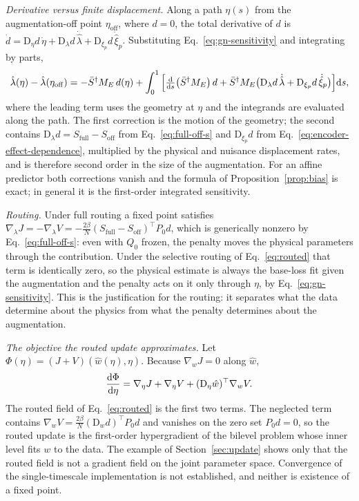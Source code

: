 \documentclass[11pt,a4paper]{article}
\newcommand{\D}{\mathrm D}
\newcommand{\full}{\mathrm{full}}
\newcommand{\off}{\mathrm{off}}
\theoremstyle{remark}
\begin{document}
\emph{Derivative versus finite displacement.} Along a path $\eta(s)$ from the augmentation-off point $\eta_\off$, where $d=0$, the total derivative of $d$ is $\dot d=\D_\eta d\,\dot\eta+\D_\lambda d\,\dot{\hat\lambda}+\D_{\xi_p}d\,\dot{\hat\xi}_p$. Substituting Eq.~\eqref{eq:gn-sensitivity} and integrating by parts,
\begin{equation}\label{eq:path}
 \hat\lambda(\eta)-\hat\lambda(\eta_\off)=-\bar S^\dagger M_E\,d(\eta)
 +\int_0^1\Big[\tfrac{\rm d}{{\rm d}s}\big(\bar S^\dagger M_E\big)\,d
 +\bar S^\dagger M_E\big(\D_\lambda d\,\dot{\hat\lambda}+\D_{\xi_p}d\,\dot{\hat\xi}_p\big)\Big]{\rm d}s ,
\end{equation}
where the leading term uses the geometry at $\eta$ and the integrands are evaluated along the path. The first correction is the motion of the geometry; the second contains $\D_\lambda d=S_\full-S_\off$ from Eq.~\eqref{eq:full-off-s} and $\D_{\xi_p}d$ from Eq.~\eqref{eq:encoder-effect-dependence}, multiplied by the physical and nuisance displacement rates, and is therefore second order in the size of the augmentation. For an affine predictor both corrections vanish and the formula of Proposition~\ref{prop:bias} is exact; in general it is the first-order integrated sensitivity.

\emph{Routing.} Under full routing a fixed point satisfies $\nabla_\lambda J=-\nabla_\lambda V=-\tfrac{2\beta}{N}(S_\full-S_\off)^\top P_0d$, which is generically nonzero by Eq.~\eqref{eq:full-off-s}: even with $Q_0$ frozen, the penalty moves the physical parameters through the contribution. Under the selective routing of Eq.~\eqref{eq:routed} that term is identically zero, so the physical estimate is always the base-loss fit given the augmentation and the penalty acts on it only through $\eta$, by Eq.~\eqref{eq:gn-sensitivity}. This is the justification for the routing: it separates what the data determine about the physics from what the penalty determines about the augmentation.

\emph{The objective the routed update approximates.} Let $\Phi(\eta)=(J+V)(\hat w(\eta),\eta)$. Because $\nabla_wJ=0$ along $\hat w$,
\begin{equation}\label{eq:hypergradient}
 \frac{{\rm d}\Phi}{{\rm d}\eta}=\nabla_\eta J+\nabla_\eta V+(\D_\eta\hat w)^\top\nabla_wV .
\end{equation}
The routed field of Eq.~\eqref{eq:routed} is the first two terms. The neglected term contains $\nabla_wV=\tfrac{2\beta}{N}(\D_wd)^\top P_0d$ and vanishes on the zero set $P_0d=0$, so the routed update is the first-order hypergradient of the bilevel problem whose inner level fits $w$ to the data. The example of Section~\ref{sec:update} shows only that the routed field is not a gradient field on the joint parameter space. Convergence of the single-timescale implementation is not established, and neither is existence of a fixed point.
\end{document}
